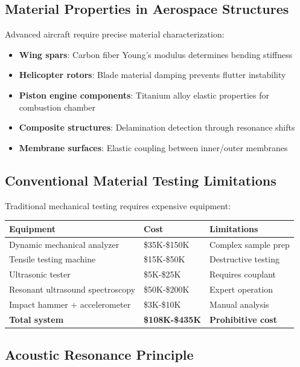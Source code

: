 \documentclass[12pt,a4paper]{article}
\begin{document}
\subsection{Material Properties in Aerospace Structures}

Advanced aircraft require precise material characterization:

\begin{itemize}
\item \textbf{Wing spars}: Carbon fiber Young's modulus determines bending stiffness
\item \textbf{Helicopter rotors}: Blade material damping prevents flutter instability
\item \textbf{Piston engine components}: Titanium alloy elastic properties for combustion chamber
\item \textbf{Composite structures}: Delamination detection through resonance shifts
\item \textbf{Membrane surfaces}: Elastic coupling between inner/outer membranes
\end{itemize}

\subsection{Conventional Material Testing Limitations}

Traditional mechanical testing requires expensive equipment:

\begin{center}
\begin{tabular}{|l|l|l|}
\hline
\textbf{Equipment} & \textbf{Cost} & \textbf{Limitations} \\
\hline
Dynamic mechanical analyzer & \$35K-\$150K & Complex sample prep \\
Tensile testing machine & \$15K-\$50K & Destructive testing \\
Ultrasonic tester & \$5K-\$25K & Requires couplant \\
Resonant ultrasound spectroscopy & \$50K-\$200K & Expert operation \\
Impact hammer + accelerometer & \$3K-\$10K & Manual analysis \\
\hline
\textbf{Total system} & \textbf{\$108K-\$435K} & \textbf{Prohibitive cost} \\
\hline
\end{tabular}
\end{center}

\subsection{Acoustic Resonance Principle}
\end{document}
